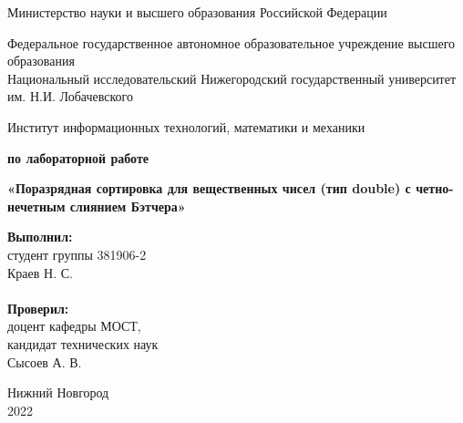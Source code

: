 \documentclass{report}
\begin{document}
\begin{titlepage}

\begin{center}
Министерство науки и высшего образования Российской Федерации
\end{center}

\begin{center}
Федеральное государственное автономное образовательное учреждение высшего образования \\
Национальный исследовательский Нижегородский государственный университет им. Н.И. Лобачевского
\end{center}

\begin{center}
Институт информационных технологий, математики и механики
\end{center}

\vspace{4em}

\begin{center}
\textbf{ по лабораторной работе} \\
\end{center}
\begin{center}
\textbf{\Large«Поразрядная сортировка для вещественных чисел (тип double) с четно-нечетным слиянием Бэтчера»} \\
\end{center}

\vspace{4em}

\newbox{\lbox}
\newlength{\maxl}
\setlength{\maxl}{\wd\lbox}
\hfill\parbox{7cm}{
\hspace*{5cm}\hspace*{-5cm}\textbf{Выполнил:} \\ студент группы 381906-2 \\ Краев Н. С.\\
\\
\hspace*{5cm}\hspace*{-5cm}\textbf{Проверил:}\\ доцент кафедры МОСТ, \\ кандидат технических наук \\ Сысоев А. В.\\
}
\vspace{\fill}

\begin{center} Нижний Новгород \\ 2022 \end{center}

\end{titlepage}
\end{document}

